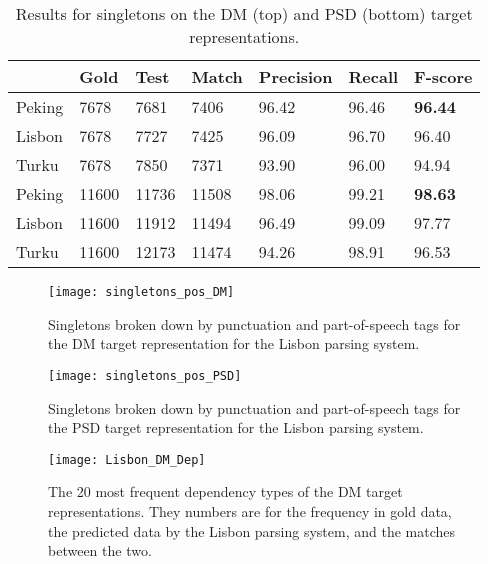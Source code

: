\begin{table}
    \centering
    \smaller[0.5]
    \begin{tabular}{@{}lllllll@{}}
        \toprule
        \textbf{ } & \textbf{Gold} & \textbf{Test} & \textbf{Match} & \textbf{Precision} & \textbf{Recall} & \textbf{F-score} \\
        \midrule
        Peking &7678       &7681       &7406       & 96.42     & 96.46     & \textbf{96.44}    \\
        Lisbon &7678       &7727       &7425       & 96.09     & 96.70     & 96.40    \\
        Turku &7678       &7850       &7371       & 93.90    & 96.00     & 94.94    \\
        \midrule
        Peking &11600      &11736      &11508      & 98.06     & 99.21     & \textbf{98.63}    \\
        Lisbon &11600      &11912      &11494      & 96.49     & 99.09     & 97.77    \\
        Turku &11600      &12173      &11474      & 94.26     & 98.91     & 96.53    \\
        \bottomrule
    \end{tabular}
    \caption{Results for singletons on the DM (top) and PSD (bottom) target representations.}
    \label{fig:singletons}
\end{table}

\begin{figure}[h]
    \centering
    \begin{minipage}{0.8\textwidth}
        \centering
        \texttt{[image: singletons\_pos\_DM]}
    \end{minipage}\hfill
    \caption{Singletons broken down by punctuation and part-of-speech tags for the DM target representation for the Lisbon parsing system.}
    \label{fig:singletons_pos_DM}
\end{figure}

\begin{figure}[h]
    \centering
    \begin{minipage}{0.8\textwidth}
        \centering
        \texttt{[image: singletons\_pos\_PSD]}
    \end{minipage}
    \caption{Singletons broken down by punctuation and part-of-speech tags for the PSD target representation for the Lisbon parsing system.}
    \label{fig:singletons_pos_PSD}
\end{figure}

\begin{figure}[h]
    \centering
    \begin{minipage}{0.8\textwidth}
        \centering
        \texttt{[image: Lisbon\_DM\_Dep]}
    \end{minipage}\hfill
    \caption{The 20 most frequent dependency types of the DM target representations. They numbers are for the frequency in gold data, the predicted data by the Lisbon parsing system, and the matches between the two.}
    \label{fig:lisbon_dep_DM}
\end{figure}

